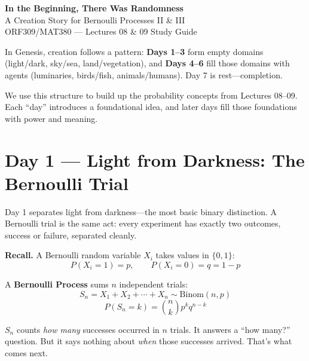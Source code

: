 \documentclass[11pt]{article}
\begin{document}
\begin{center}
{\LARGE\bfseries\color{creation} In the Beginning, There Was Randomness}\\[6pt]
{\large A Creation Story for Bernoulli Processes II \& III}\\[4pt]
{\normalsize ORF309/MAT380 --- Lectures 08 \& 09 Study Guide}
\end{center}

\vspace{0.5cm}

\begin{creationbox}
In Genesis, creation follows a pattern: \textbf{Days 1--3} form empty domains (light/dark, sky/sea, land/vegetation), and \textbf{Days 4--6} fill those domains with agents (luminaries, birds/fish, animals/humans). Day 7 is rest---completion.

We use this structure to build up the probability concepts from Lectures 08--09. Each ``day'' introduces a foundational idea, and later days fill those foundations with power and meaning.
\end{creationbox}

\vspace{0.5cm}

\section{Day 1 --- Light from Darkness: The Bernoulli Trial}

\begin{creationbox}
Day 1 separates light from darkness---the most basic binary distinction. A Bernoulli trial is the same act: every experiment has exactly two outcomes, success or failure, separated cleanly.
\end{creationbox}

\textbf{Recall.} A Bernoulli random variable $X_i$ takes values in $\{0, 1\}$:
\[
P(X_i = 1) = p, \qquad P(X_i = 0) = q = 1-p
\]

A \textbf{Bernoulli Process} sums $n$ independent trials:
\[
S_n = X_1 + X_2 + \cdots + X_n \sim \text{Binom}(n, p)
\]
\[
P(S_n = k) = \binom{n}{k} p^k q^{n-k}
\]

\begin{conceptbox}
$S_n$ counts \emph{how many} successes occurred in $n$ trials. It answers a ``how many?'' question. But it says nothing about \emph{when} those successes arrived. That's what comes next.
\end{conceptbox}
\end{document}
